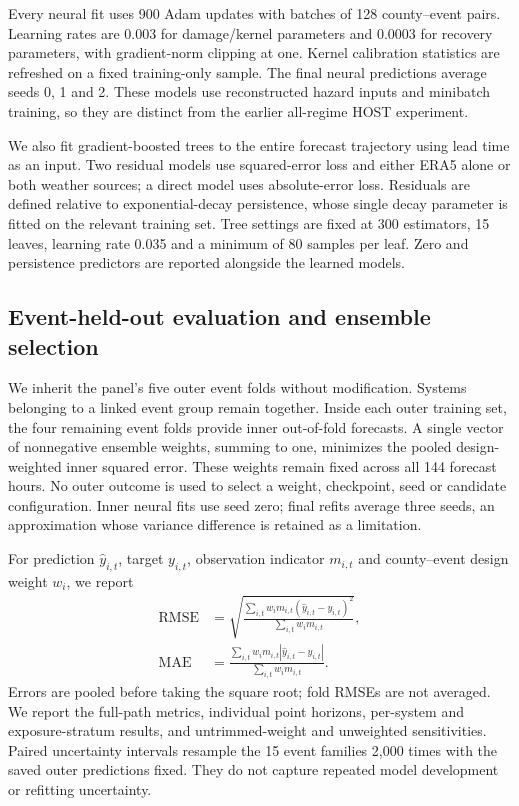 Every neural fit uses 900 Adam updates with batches of 128 county--event
pairs. Learning rates are 0.003 for damage/kernel parameters and 0.0003 for
recovery parameters, with gradient-norm clipping at one. Kernel calibration
statistics are refreshed on a fixed training-only sample. The final neural
predictions average seeds 0, 1 and 2. These models use reconstructed hazard
inputs and minibatch training, so they are distinct from the earlier
all-regime HOST experiment.

We also fit gradient-boosted trees to the entire forecast trajectory using
lead time as an input. Two residual models use squared-error loss and either
ERA5 alone or both weather sources; a direct model uses absolute-error loss.
Residuals are defined relative to exponential-decay persistence, whose
single decay parameter is fitted on the relevant training set. Tree settings
are fixed at 300 estimators, 15 leaves, learning rate 0.035 and a minimum of
80 samples per leaf. Zero and persistence predictors are reported alongside
the learned models.

\subsection{Event-held-out evaluation and ensemble selection}
We inherit the panel's five outer event folds without modification. Systems
belonging to a linked event group remain together. Inside each outer training
set, the four remaining event folds provide inner out-of-fold forecasts.
A single vector of nonnegative ensemble weights, summing to one, minimizes
the pooled design-weighted inner squared error. These weights remain fixed
across all 144 forecast hours. No outer outcome is used to select a weight,
checkpoint, seed or candidate configuration. Inner neural fits use seed zero;
final refits average three seeds, an approximation whose variance difference
is retained as a limitation.

For prediction $\widehat y_{i,t}$, target $y_{i,t}$, observation indicator
$m_{i,t}$ and county--event design weight $w_i$, we report
\begin{align}
 \mathrm{RMSE}&=\sqrt{\frac{\sum_{i,t}w_i m_{i,t}
 (\widehat y_{i,t}-y_{i,t})^2}{\sum_{i,t}w_i m_{i,t}}},\\
 \mathrm{MAE}&=\frac{\sum_{i,t}w_i m_{i,t}
 |\widehat y_{i,t}-y_{i,t}|}{\sum_{i,t}w_i m_{i,t}}.
\end{align}
Errors are pooled before taking the square root; fold RMSEs are not averaged.
We report the full-path metrics, individual point horizons, per-system and
exposure-stratum results, and untrimmed-weight and unweighted sensitivities.
Paired uncertainty intervals resample the 15 event families 2,000 times with
the saved outer predictions fixed. They do not capture repeated model
development or refitting uncertainty.

